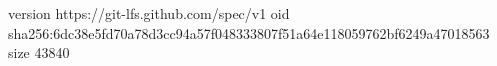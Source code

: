 version https://git-lfs.github.com/spec/v1
oid sha256:6dc38e5fd70a78d3cc94a57f048333807f51a64e118059762bf6249a47018563
size 43840
